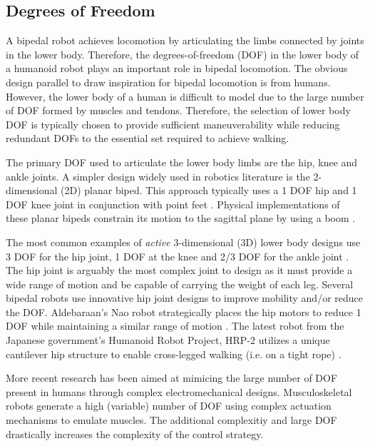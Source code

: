 \subsection{Degrees of Freedom} %
\label{sub:related_degrees_of_freedom}
A bipedal robot achieves locomotion by articulating the limbs connected by joints in the lower body. Therefore, the degrees-of-freedom (DOF) in the lower body of a humanoid robot plays an important role in bipedal locomotion. The obvious design parallel to draw inspiration for bipedal locomotion is from humans. However, the lower body of a human is difficult to model due to the large number of DOF formed by muscles and tendons. Therefore, the selection of lower body DOF is typically chosen to provide sufficient maneuverability while reducing redundant DOFs to the essential set required to achieve walking. 

The primary DOF used to articulate the lower body limbs are the hip, knee and ankle joints. A simpler design widely used in robotics literature is the 2-dimensional (2D) planar biped. This approach typically uses a 1 DOF hip and 1 DOF knee joint in conjunction with point feet \cite{tzafestas1996robust}. Physical implementations of these planar bipeds constrain its motion to the sagittal plane by using a boom \cite{chevallereau2000design,pratt2001virtual,Wight:2008vt}. 

The most common examples of \emph{active} 3-dimensional (3D) lower body designs use 3 DOF for the hip joint, 1 DOF at the knee and 2/3 DOF for the ankle joint \cite{Hirai1998,IllWooPark:2005et,Kaneko:2004wq,Ogura:2006bm,yamaguchi1999}. The hip joint is arguably the most complex joint to design as it must provide a wide range of motion and be capable of carrying the weight of each leg. Several bipedal robots use innovative hip joint designs to improve mobility and/or reduce the DOF. Aldebaraan's Nao robot strategically places the hip motors to reduce 1 DOF while maintaining a similar range of motion \cite{Gouaillier:2008ug}. The latest robot from the Japanese government's Humanoid Robot Project, HRP-2 utilizes a unique cantilever hip structure to enable cross-legged walking (i.e. on a tight rope) \cite{Kaneko:2004wq}. 

More recent research has been aimed at mimicing the large number of DOF present in humans through complex electromechanical designs. Musculoskeletal robots \cite{Mizuuchi:2007em,Osada:2010cj} generate a high (variable) number of DOF using complex actuation mechanisms to emulate muscles. The additional complexitiy and large DOF drastically increases the complexity of the control strategy. 

